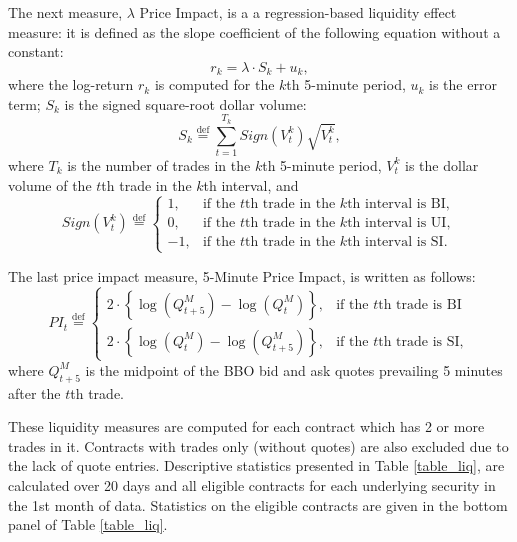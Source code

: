 \documentclass[a4paper,12pt]{article}
\theoremstyle{plain}
\theoremstyle{definition}
\begin{document}
The next measure, $\lambda$ Price Impact, is a a regression-based liquidity effect measure: it is defined as the slope coefficient of the following equation without a constant:
\begin{equation}
r_k = \lambda \cdot S_k + u_k,
\end{equation} 
where the log-return $r_k$ is computed for the $k$th 5-minute period, $u_k$ is the error term; $S_k$ is the signed square-root dollar volume:
\begin{equation}
S_k \stackrel{\operatorname{def}}{=} \sum_{t=1}^{T_k} Sign(V_t^k)\sqrt{V_t^k},
\end{equation} 
where $T_k$ is the number of trades in the $k$th 5-minute period, $V_t^k$ is the dollar volume of the $t$th trade in the $k$th interval, and
\begin{equation}
Sign(V_t^k) \stackrel{\operatorname{def}}{=} \left\{ \begin{array}{ll}
              1, & \mbox{if the $t$th trade in the $k$th interval is BI}, \\
              0,& \mbox{if the $t$th trade in the $k$th interval is UI},  \\
              -1, & \mbox{if the $t$th trade in the $k$th interval is SI}. \end{array} \right.
\end{equation}

The last price impact measure, 5-Minute Price Impact, is written as follows:
\begin{equation}
PI_t \stackrel{\operatorname{def}}{=} \left\{ \begin{array}{ll}
              2 \cdot \left\{\log(Q^M_{t+5}) - \log(Q^M_t)\right\}, & \mbox{if the $t$th trade is BI}\\
              2 \cdot \left\{ \log(Q^M_t) - \log(Q^M_{t+5})\right\}, & \mbox{if the $t$th trade is SI},\end{array} \right.
\end{equation}
where $Q^M_{t+5}$ is the midpoint of the BBO bid and ask quotes prevailing 5 minutes after the $t$th trade.

These liquidity measures are computed for each contract which has 2 or more trades in it. Contracts with trades only (without quotes) are also excluded due to the lack of quote entries. Descriptive statistics presented in Table \ref{table_liq}, are calculated over 20 days and all eligible contracts for each underlying security in the 1st month of data. Statistics on the eligible contracts are given in the bottom panel of Table \ref{table_liq}. 
\end{document}
